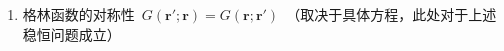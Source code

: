 \documentclass[12pt,a4paper]{article}
\newcommand\diff{\,\mathrm{d}}
\renewcommand*{\vec}[1]{\bm{#1}}%
\renewcommand{\[}{\ $\displaystyle}
\renewcommand{\]}{$\ }%
\begin{document}
\begin{enumerate}
	   \item 格林函数的对称性\[G(\vec r';\vec r ) = G(\vec r ; \vec r')\]（取决于具体方程，此处对于上述稳恒问题成立）
	  \end{enumerate}
	  
\end{document}
